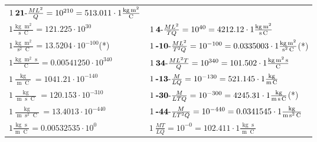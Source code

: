 \begin{center}
\begin{longtable}{l l}
	{\color{black}$1\:\text{\textbf{21}-} \frac{ML^2}{Q}=10^{210} = 513.011 \cdot 1 \bm{\mathrm{ }}\frac{\operatorname{kg}\operatorname{m}^2}{\operatorname{C}}$}\\
{\color{black}$1 \bm{\mathrm{ }}\frac{\operatorname{kg}\operatorname{m}^2}{\operatorname{s}\operatorname{C}} = 121.225\cdot10^{30} $}&
	{\color{black}$1\:\text{\textbf{4}-} \frac{ML^2}{TQ}=10^{40} = 4212.12 \cdot 1 \bm{\mathrm{ }}\frac{\operatorname{kg}\operatorname{m}^2}{\operatorname{s}\operatorname{C}}$}\\
{\color{black}$1 \bm{\mathrm{ }}\frac{\operatorname{kg}\operatorname{m}^2}{\operatorname{s}^2\operatorname{C}} = 13.5204\cdot10^{-100} $}\quad(*)&
	{\color{black}$1\:\text{\textbf{-10}-} \frac{ML^2}{T^2Q}=10^{-100} = 0.0335003 \cdot 1 \bm{\mathrm{ }}\frac{\operatorname{kg}\operatorname{m}^2}{\operatorname{s}^2\operatorname{C}}$}\quad(*)\\
{\color{black}$1 \bm{\mathrm{ }}\frac{\operatorname{kg}\operatorname{m}^2\operatorname{s}}{\operatorname{C}} = 0.00541250\cdot10^{340} $}&
	{\color{black}$1\:\text{\textbf{34}-} \frac{ML^2T}{Q}=10^{340} = 101.502 \cdot 1 \bm{\mathrm{ }}\frac{\operatorname{kg}\operatorname{m}^2\operatorname{s}}{\operatorname{C}}$}\\
{\color{black}$1 \bm{\mathrm{ }}\frac{\operatorname{kg}}{\operatorname{m}\operatorname{C}} = 1041.21\cdot10^{-140} $}&
	{\color{black}$1\:\text{\textbf{-13}-} \frac{M}{LQ}=10^{-130} = 521.145 \cdot 1 \bm{\mathrm{ }}\frac{\operatorname{kg}}{\operatorname{m}\operatorname{C}}$}\\
{\color{black}$1 \bm{\mathrm{ }}\frac{\operatorname{kg}}{\operatorname{m}\operatorname{s}\operatorname{C}} = 120.153\cdot10^{-310} $}&
	{\color{black}$1\:\text{\textbf{-30}-} \frac{M}{LTQ}=10^{-300} = 4245.31 \cdot 1 \bm{\mathrm{ }}\frac{\operatorname{kg}}{\operatorname{m}\operatorname{s}\operatorname{C}}$}\quad(*)\\
{\color{black}$1 \bm{\mathrm{ }}\frac{\operatorname{kg}}{\operatorname{m}\operatorname{s}^2\operatorname{C}} = 13.4013\cdot10^{-440} $}&
	{\color{black}$1\:\text{\textbf{-44}-} \frac{M}{LT^2Q}=10^{-440} = 0.0341545 \cdot 1 \bm{\mathrm{ }}\frac{\operatorname{kg}}{\operatorname{m}\operatorname{s}^2\operatorname{C}}$}\\
{\color{black}$1 \bm{\mathrm{ }}\frac{\operatorname{kg}\operatorname{s}}{\operatorname{m}\operatorname{C}} = 0.00532535\cdot10^{0} $}&
	{\color{black}$1\:\text{} \frac{MT}{LQ}=10^{-0} = 102.411 \cdot 1 \bm{\mathrm{ }}\frac{\operatorname{kg}\operatorname{s}}{\operatorname{m}\operatorname{C}}$}\\

\end{longtable}
\end{center}

